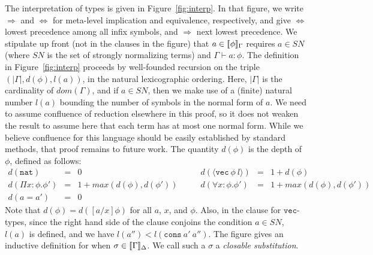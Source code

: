 \documentclass[copyright]{eptcs}
\newcommand{\To}{\Rightarrow}
\newcommand{\SN}[0]{\textit{SN}}
\newcommand{\vc}[0]{\texttt{vec}}
\newcommand{\nat}[0]{\texttt{nat}}
\newcommand{\cons}[0]{\texttt{cons}}
\newcommand{\interp}[1]{[\negthinspace[#1]\negthinspace]}
\begin{document}
The interpretation of types is given in Figure~\ref{fig:interp}.  In
that figure, we write $\To$ and $\Leftrightarrow$ for meta-level
implication and equivalence, respectively, and give $\Leftrightarrow$
lowest precedence among all infix symbols, and $\To$ next lowest
precedence.  We stipulate up front (not in the clauses in the figure)
that $a\in\interp{\phi}_\Gamma$ requires $a\in\SN$ (where $\SN$ is the
set of strongly normalizing terms) and $\Gamma\vdash a:\phi$.  The
definition in Figure~\ref{fig:interp} proceeds by well-founded
recursion on the triple $(|\Gamma|,d(\phi),l(a))$, in the natural
lexicographic ordering.  Here, $|\Gamma|$ is the cardinality of
$\textit{dom}(\Gamma)$, and if $a\in\SN$, then we make use of a
(finite) natural number $l(a)$ bounding the number of symbols in the
normal form of $a$.  We need to assume confluence of reduction
elsewhere in this proof, so it does not weaken the result to assume
here that each term has at most one normal form.  While we believe
confluence for this language should be easily established by standard
methods, that proof remains to future work.  The quantity $d(\phi)$ is
the depth of $\phi$, defined as follows:
\[
\begin{array}{lllllll}
d(\nat) & = & 0 &\ \ \ \ \ &
d(\langle\vc\ \phi\ l\rangle) & = & 1+d(\phi) \\
d(\Pi x:\phi.\phi') & = & 1+\textit{max}(d(\phi),d(\phi')) & \ \ \ \ \ &
d(\forall x:\phi.\phi') & = & 1+\textit{max}(d(\phi),d(\phi'))\\
d(a = a') & = & 0 & \ &\ &\ &\ 
\end{array}
\]
\noindent Note that $d(\phi)=d([a/x]\phi)$ for all $a$, $x$, and
$\phi$.  Also, in the clause for $\vc$-types, since the right hand
side of the clause conjoins the condition $a\in\SN$, $l(a)$ is
defined, and we have $l(a'')<l(\cons\ a'\ a'')$.  The figure gives an
inductive definition for when $\sigma\in\interp{\Gamma}_\Delta$.  We
call such a $\sigma$ a \emph{closable substitution}.
\end{document}

